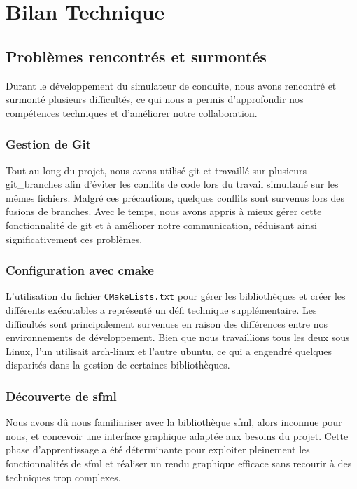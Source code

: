 \section{Bilan Technique}\label{sec:bilan-technique}

\subsection{Problèmes rencontrés et surmontés}\label{subsec:problemes-rencontres-et-surmontes}
Durant le développement du simulateur de conduite, nous avons rencontré et surmonté plusieurs difficultés, ce qui nous a permis d'approfondir nos compétences techniques et d'améliorer notre collaboration.

\subsubsection{Gestion de Git}\label{subsubsec:git}
Tout au long du projet, nous avons utilisé \gls{git} et travaillé sur plusieurs \gls{git_branches} afin d'éviter les conflits de code lors du travail simultané sur les mêmes fichiers.
Malgré ces précautions, quelques conflits sont survenus lors des fusions de branches.
Avec le temps, nous avons appris à mieux gérer cette fonctionnalité de \gls{git} et à améliorer notre communication, réduisant ainsi significativement ces problèmes.

\subsubsection{Configuration avec \gls{cmake}}\label{subsubsec:cmake}
L'utilisation du fichier \texttt{CMakeLists.txt} pour gérer les bibliothèques et créer les différents exécutables a représenté un défi technique supplémentaire.
Les difficultés sont principalement survenues en raison des différences entre nos environnements de développement.
Bien que nous travaillions tous les deux sous Linux, l'un utilisait \gls{arch-linux} et l'autre \gls{ubuntu}, ce qui a engendré quelques disparités dans la gestion de certaines bibliothèques.

\subsubsection{Découverte de \gls{sfml}}\label{subsubsec:sfml}
Nous avons dû nous familiariser avec la bibliothèque \gls{sfml}, alors inconnue pour nous, et concevoir une interface graphique adaptée aux besoins du projet.
Cette phase d'apprentissage a été déterminante pour exploiter pleinement les fonctionnalités de \gls{sfml} et réaliser un rendu graphique efficace sans recourir à des techniques trop complexes.

